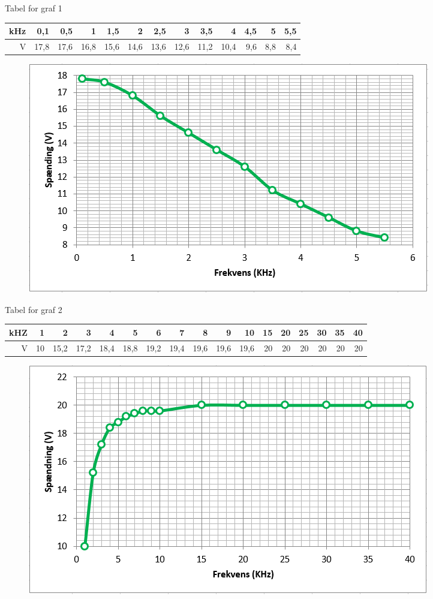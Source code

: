 


Tabel for graf 1

\begin{tabular}{|r|r|r|r|r|r|r|r|r|r|r|r|r|} \hline
kHz & 0,1 & 0,5 & 1 & 1,5 & 2 & 2,5 & 3 & 3,5 & 4 & 4,5 & 5 & 5,5 \\ \hline
V & 17,8 & 17,6 & 16,8 & 15,6 & 14,6 & 13,6 & 12,6 & 11,2 & 10,4 & 9,6 & 8,8 & 8,4\\ \hline
\end{tabular}

\begin{figure}[H]
\includegraphics[scale=1]{Graf1}
\end{figure}

Tabel for graf 2

\begin{tabular}{|r|r|r|r|r|r|r|r|r|r|r|r|r|r|r|r|r|} \hline
kHZ & 1 & 2 & 3 & 4 & 5 & 6 & 7 & 8 & 9 & 10 & 15 & 20 & 25 & 30 & 35 & 40 \\ \hline
V & 10 & 15,2 & 17,2 & 18,4 & 18,8 & 19,2 & 19,4 & 19,6 & 19,6 & 19,6 & 20 & 20 & 20 & 20 & 20 & 20 \\ \hline
\end{tabular}

\begin{figure}[H]
\includegraphics[scale=1]{Graf2}
\end{figure}

